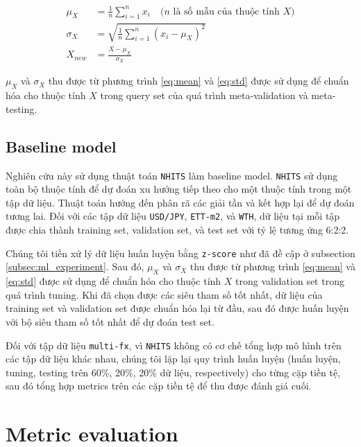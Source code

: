 \begin{align}
    \mu_{X} &= \frac{1}{n} \sum_{i=1}^n{x_i} \quad \text{($n$ là số mẫu của thuộc tính $X$)} \label{eq:mean}\\
    \sigma_{X} &= \sqrt{\frac{1}{n} \sum_{i=1}^n{(x_i - \mu_X)^2}} \label{eq:std}\\
    X_{new} &= \frac{X - \mu_{X}}{\sigma_{X}} \label{eq:z_score}
\end{align}

$\mu_{X}$ và $\sigma_{X}$ thu được từ phương trình \ref{eq:mean} và \ref{eq:std} được sử dụng để chuẩn hóa cho thuộc tính $X$ trong query set của quá trình meta-validation và meta-testing.

\subsection{Baseline model}
\label{subsec:baseline_experiment}

Nghiên cứu này sử dụng thuật toán \verb|NHITS| \cite{challu2023nhits} làm baseline model. \verb|NHITS| sử dụng toàn bộ thuộc tính để dự đoán xu hướng tiếp theo cho một thuộc tính trong một tập dữ liệu. Thuật toán hướng đến phân rã các giải tần và kết hợp lại để dự đoán tương lai. Đối với các tập dữ liệu \verb|USD/JPY|, \verb|ETT-m2|, và \verb|WTH|, dữ liệu tại mỗi tập được chia thành training set, validation set, và test set với tỷ lệ tương ứng 6:2:2.

Chúng tôi tiền xử lý dữ liệu huấn luyện bằng \verb|z-score| như đã đề cập ở subsection \ref{subsec:ml_experiment}. Sau đó, $\mu_{X}$ và $\sigma_{X}$ thu được từ phương trình \ref{eq:mean} và \ref{eq:std} được sử dụng để chuẩn hóa cho thuộc tính $X$ trong validation set trong quá trình tuning. Khi đã chọn được các siêu tham số tốt nhất, dữ liệu của training set và validation set được chuẩn hóa lại từ đầu, sau đó được huấn luyện với bộ siêu tham số tốt nhất để dự đoán test set.

Đối với tập dữ liệu \verb|multi-fx|, vì \verb|NHITS| không có cơ chế tổng hợp mô hình trên các tập dữ liệu khác nhau, chúng tôi lặp lại quy trình huấn luyện (huấn luyện, tuning, testing trên 60\%, 20\%, 20\% dữ liệu, respectively) cho từng cặp tiền tệ, sau đó tổng hợp metrics trên các cặp tiền tệ để thu được đánh giá cuối.

\section{Metric evaluation}

